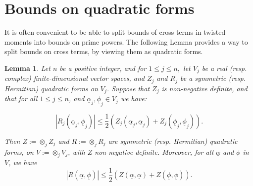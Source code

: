 \documentclass[12pt]{amsart}
\numberwithin{equation}{section}
\newtheorem{lem}[thm]{Lemma}
\numberwithin{thm}{section}
\newcommand{\1}{\mathbf 1}
\begin{document}
\section{Bounds on quadratic forms}\label{Sec: QF}
It is often convenient to be able to split bounds of cross terms in twisted moments into bounds on prime powers. The following Lemma provides a way to split bounds on cross terms, by viewing them as quadratic forms. 
\begin{lem}\label{splitbound} 
	Let $n$ be a positive integer, and for $1\le j\le n,$ let $V_j$ be a real (resp. complex) finite-dimensional vector spaces, and  $Z_j$  and $R_j$  be a
	symmetric (resp. Hermitian) quadratic forms on $V_j$. Suppose that $Z_j$ is non-negative definite, and that for all $1\le j\le n$, and $\underline{\alpha}_j, \underline{\phi}_j\in V_j$ we have:
	
	\begin{equation}\label{onedom}\left| R_j(\underline{\alpha}_j,\underline{\phi}_j)\right|\le \frac{1}{2}\left(Z_j(\underline{\alpha}_j,\underline{\alpha}_j)+Z_j(\underline{\phi}_j,\underline{\phi}_j)\right).\end{equation}
	
	Then $Z:=\otimes_j Z_j$ and $R:=\otimes_j R_j$ are  
	symmetric (resp. Hermitian) quadratic forms,  on $V:=\otimes_j V_j$, with $Z$ non-negative definite. Moreover, for all $\underline{\alpha}$ and $\underline{\phi}$ in $V$, we have 
	\begin{equation}\label{mixdom}
		\left| R(\underline{\alpha},\underline{\phi})\right|\le \frac{1}{2}\left(Z(\underline{\alpha},\underline{\alpha})+Z(\underline{\phi},\underline{\phi})\right).\end{equation}
\end{lem}
\end{document}
